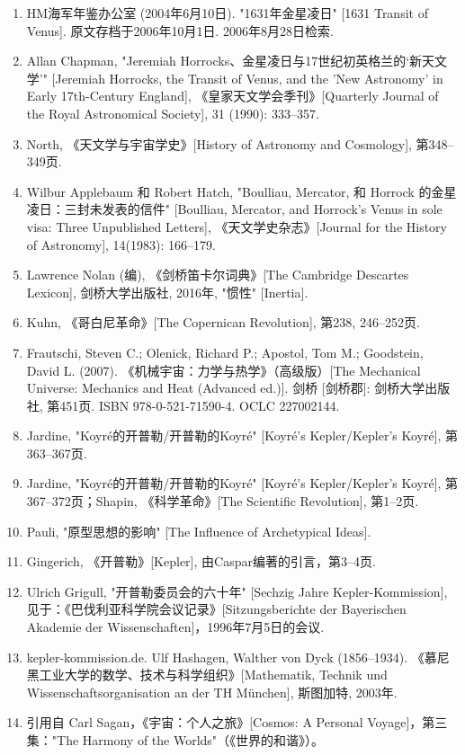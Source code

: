 \begin{enumerate}
\item HM海军年鉴办公室 (2004年6月10日). "1631年金星凌日" [1631 Transit of Venus]. 原文存档于2006年10月1日. 2006年8月28日检索.
\item Allan Chapman, "Jeremiah Horrocks、金星凌日与17世纪初英格兰的‘新天文学’" [Jeremiah Horrocks, the Transit of Venus, and the 'New Astronomy' in Early 17th-Century England], 《皇家天文学会季刊》[Quarterly Journal of the Royal Astronomical Society], 31 (1990): 333–357.
\item North, 《天文学与宇宙学史》[History of Astronomy and Cosmology], 第348–349页.
\item Wilbur Applebaum 和 Robert Hatch, "Boulliau, Mercator, 和 Horrock 的金星凌日：三封未发表的信件" [Boulliau, Mercator, and Horrock's Venus in sole visa: Three Unpublished Letters], 《天文学史杂志》[Journal for the History of Astronomy], 14(1983): 166–179.
\item Lawrence Nolan (编), 《剑桥笛卡尔词典》[The Cambridge Descartes Lexicon], 剑桥大学出版社, 2016年, "惯性" [Inertia].
\item Kuhn, 《哥白尼革命》[The Copernican Revolution], 第238, 246–252页.
\item Frautschi, Steven C.; Olenick, Richard P.; Apostol, Tom M.; Goodstein, David L. (2007). 《机械宇宙：力学与热学》（高级版）[The Mechanical Universe: Mechanics and Heat (Advanced ed.)]. 剑桥 [剑桥郡]: 剑桥大学出版社, 第451页. ISBN 978-0-521-71590-4. OCLC 227002144.
\item Jardine, "Koyré的开普勒/开普勒的Koyré" [Koyré's Kepler/Kepler's Koyré], 第363–367页.
\item Jardine, "Koyré的开普勒/开普勒的Koyré" [Koyré's Kepler/Kepler's Koyré], 第367–372页；Shapin, 《科学革命》[The Scientific Revolution], 第1–2页.
\item Pauli, "原型思想的影响" [The Influence of Archetypical Ideas].
\item Gingerich, 《开普勒》[Kepler], 由Caspar编著的引言，第3–4页.
\item Ulrich Grigull, "开普勒委员会的六十年" [Sechzig Jahre Kepler-Kommission], 见于：《巴伐利亚科学院会议记录》[Sitzungsberichte der Bayerischen Akademie der Wissenschaften]，1996年7月5日的会议.
\item kepler-kommission.de. Ulf Hashagen, Walther von Dyck (1856–1934). 《慕尼黑工业大学的数学、技术与科学组织》[Mathematik, Technik und Wissenschaftsorganisation an der TH München], 斯图加特, 2003年.
\item 引用自 Carl Sagan，《宇宙：个人之旅》[Cosmos: A Personal Voyage]，第三集："The Harmony of the Worlds"（《世界的和谐》）。

\end{enumerate}
